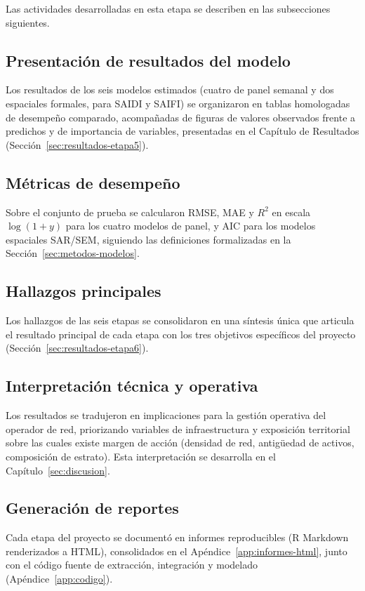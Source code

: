 Las actividades desarrolladas en esta etapa se describen en las subsecciones siguientes.

\subsection{Presentación de resultados del modelo}
Los resultados de los seis modelos estimados (cuatro de panel semanal y dos espaciales formales, para SAIDI y SAIFI) se organizaron en tablas homologadas de desempeño comparado, acompañadas de figuras de valores observados frente a predichos y de importancia de variables, presentadas en el Capítulo de Resultados (Sección~\ref{sec:resultados-etapa5}).

\subsection{Métricas de desempeño}
Sobre el conjunto de prueba se calcularon RMSE, MAE y $R^2$ en escala $\log(1+y)$ para los cuatro modelos de panel, y AIC para los modelos espaciales SAR/SEM, siguiendo las definiciones formalizadas en la Sección~\ref{sec:metodos-modelos}.

\subsection{Hallazgos principales}
Los hallazgos de las seis etapas se consolidaron en una síntesis única que articula el resultado principal de cada etapa con los tres objetivos específicos del proyecto (Sección~\ref{sec:resultados-etapa6}).

\subsection{Interpretación técnica y operativa}
Los resultados se tradujeron en implicaciones para la gestión operativa del operador de red, priorizando variables de infraestructura y exposición territorial sobre las cuales existe margen de acción (densidad de red, antigüedad de activos, composición de estrato). Esta interpretación se desarrolla en el Capítulo~\ref{sec:discusion}.

\subsection{Generación de reportes}
Cada etapa del proyecto se documentó en informes reproducibles (R Markdown renderizados a HTML), consolidados en el Apéndice~\ref{app:informes-html}, junto con el código fuente de extracción, integración y modelado (Apéndice~\ref{app:codigo}).

